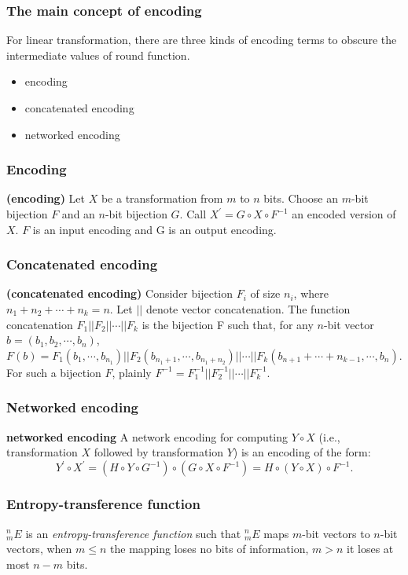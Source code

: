\documentclass{beamer}
\begin{document}
\frame
{
\frametitle{The main concept of encoding}
For linear transformation, there are three kinds of encoding terms to obscure the intermediate values of round function.
\newline
\begin{itemize}
\item encoding

\item concatenated encoding

\item networked encoding
\end{itemize}
}

\frame
{
\frametitle{Encoding}
\begin{definition}{\textbf{(encoding)}}
Let $X$ be a transformation from $m$ to $n$ bits. Choose an $m$-bit bijection $F$ and an $n$-bit bijection $G$. Call $X^{'}=G \circ X \circ F^{-1}$ an encoded version of $X$. $F$ is an input encoding and G is an output encoding.
\end{definition}
}

\frame
{
\frametitle{Concatenated encoding}
\begin{definition}{\textbf{(concatenated encoding)}}
Consider bijection $F_{i}$ of size $n_{i}$, where $n_{1} + n_{2} + \cdots + n_{k}=n$. Let $||$ denote vector concatenation.
The function concatenation $F_{1}||F_{2}||\cdots||F_{k}$ is the bijection F such that, for any $n$-bit vector $b = (b_{1}, b_{2}, \cdots, b_{n})$, $F(b) = F_{1}(b_{1}, \cdots, b_{n_{1}})||F_{2}(b_{n_{1}+1}, \cdots, b_{n_{1}+n_{2}})||\cdots||F_{k}(b_{n+1}+\cdots+n_{k-1}, \cdots, b_{n})$. For such a bijection $F$, plainly $F^{-1} = F^{-1}_{1}||F^{-1}_{2}||\cdots||F^{-1}_{k}$.
\end{definition}

}

\frame
{
\frametitle{Networked encoding}
\begin{definition}{\textbf{networked encoding}}
A network encoding for computing $Y \circ X$ (i.e., transformation $X$ followed by transformation $Y$) is an encoding of the form:
\[Y^{'} \circ X^{'} = (H \circ Y \circ G^{-1}) \circ (G \circ X \circ F^{-1}) = H \circ (Y \circ X) \circ F^{-1}.\]
\end{definition}

}

\frame
{
\frametitle{Entropy-transference function}
$^{n}_{m}E$ is an \textit{entropy-transference function} such that $^{n}_{m}E$ maps $m$-bit vectors to $n$-bit vectors, when $m \leq n$ the mapping loses no bits of information, $m > n$ it loses at most $n-m$ bits.
}
\end{document}
